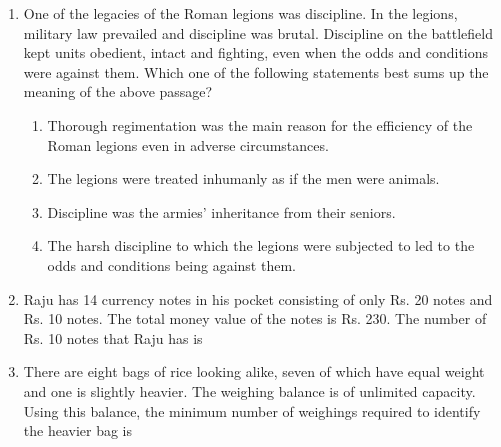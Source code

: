\documentclass[journal,12pt,onecolumn]{IEEEtran}
\theoremstyle{remark}
\begin{document}
\begin{enumerate}[start=1, label=Q.\arabic*]
\begin{enumerate}
\end{enumerate}
\hfill{}

\item One of the legacies of the Roman legions was discipline. In the legions, military law prevailed and discipline was brutal. Discipline on the battlefield kept units obedient, intact and fighting, even when the odds and conditions were against them. Which one of the following statements best sums up the meaning of the above passage?

\begin{enumerate}
    \item Thorough regimentation was the main reason for the efficiency of the Roman legions even in adverse circumstances.
    \item The legions were treated inhumanly as if the men were animals.
    \item Discipline was the armies’ inheritance from their seniors.
    \item The harsh discipline to which the legions were subjected to led to the odds and conditions being against them.
\end{enumerate}
\hfill{}

\item Raju has 14 currency notes in his pocket consisting of only Rs. 20 notes and Rs. 10 notes. The total money value of the notes is Rs. 230. The number of Rs. 10 notes that Raju has is

\begin{enumerate}
\end{enumerate}
\hfill{}

\item There are eight bags of rice looking alike, seven of which have equal weight and one is slightly heavier. The weighing balance is of unlimited capacity. Using this balance, the minimum number of weighings required to identify the heavier bag is


\end{enumerate}
\end{document}
